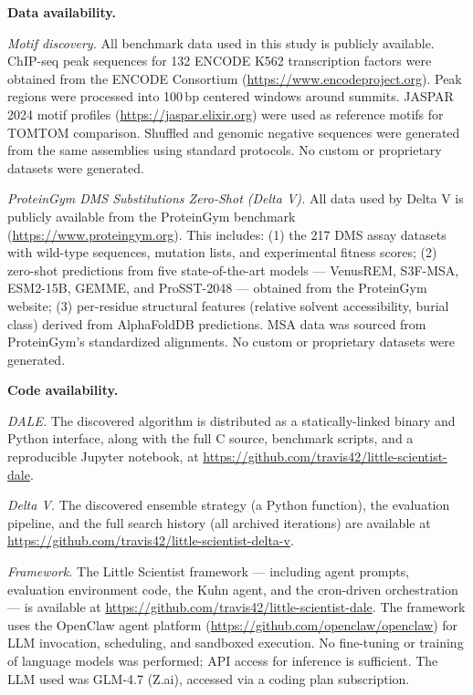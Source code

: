 \documentclass[11pt,a4paper]{article}
\begin{document}
\vspace{1em}
\noindent\textbf{Data availability.}

\emph{Motif discovery.} All benchmark data used in this study is publicly available. ChIP-seq peak sequences for 132 ENCODE K562 transcription factors were obtained from the ENCODE Consortium \citep{encode2012} (\url{https://www.encodeproject.org}). Peak regions were processed into 100\,bp centered windows around summits. JASPAR 2024 \citep{castro2024jaspar} motif profiles (\url{https://jaspar.elixir.org}) were used as reference motifs for TOMTOM comparison. Shuffled and genomic negative sequences were generated from the same assemblies using standard protocols. No custom or proprietary datasets were generated.

\emph{ProteinGym DMS Substitutions Zero-Shot (Delta V).} All data used by Delta V is publicly available from the ProteinGym benchmark \citep{notin2023proteingym} (\url{https://www.proteingym.org}). This includes: (1) the 217 DMS assay datasets with wild-type sequences, mutation lists, and experimental fitness scores; (2) zero-shot predictions from five state-of-the-art models --- VenusREM, S3F-MSA, ESM2-15B, GEMME, and ProSST-2048 --- obtained from the ProteinGym website; (3) per-residue structural features (relative solvent accessibility, burial class) derived from AlphaFoldDB predictions. MSA data was sourced from ProteinGym's standardized alignments. No custom or proprietary datasets were generated.

\vspace{1em}
\noindent\textbf{Code availability.}

\emph{DALE.} The discovered algorithm is distributed as a statically-linked binary and Python interface, along with the full C source, benchmark scripts, and a reproducible Jupyter notebook, at \url{https://github.com/travis42/little-scientist-dale}.

\emph{Delta V.} The discovered ensemble strategy (a Python function), the evaluation pipeline, and the full search history (all archived iterations) are available at \url{https://github.com/travis42/little-scientist-delta-v}.

\emph{Framework.} The Little Scientist framework --- including agent prompts, evaluation environment code, the Kuhn agent, and the cron-driven orchestration --- is available at \url{https://github.com/travis42/little-scientist-dale}. The framework uses the OpenClaw agent platform (\url{https://github.com/openclaw/openclaw}) for LLM invocation, scheduling, and sandboxed execution. No fine-tuning or training of language models was performed; API access for inference is sufficient. The LLM used was GLM-4.7 (Z.ai), accessed via a coding plan subscription.
\end{document}
